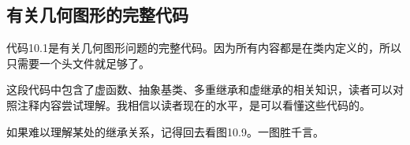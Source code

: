 \subsection*{有关几何图形的完整代码}
代码10.1是有关几何图形问题的完整代码。因为所有内容都是在类内定义的，所以只需要一个头文件就足够了。\par
这段代码中包含了虚函数、抽象基类、多重继承和虚继承的相关知识，读者可以对照注释内容尝试理解。我相信以读者现在的水平，是可以看懂这些代码的。\par
如果难以理解某处的继承关系，记得回去看图10.9。一图胜千言。\par

